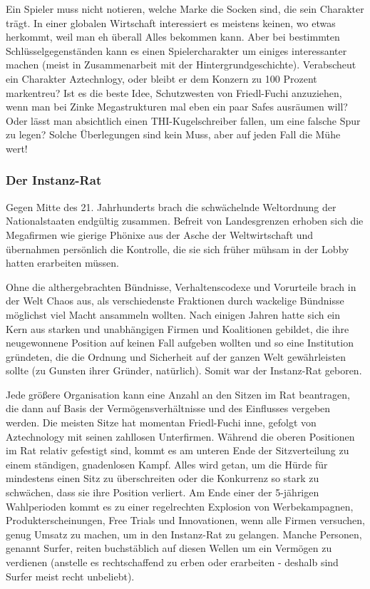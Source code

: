 Ein Spieler muss nicht notieren, welche Marke die Socken sind, die sein Charakter trägt. In einer globalen Wirtschaft interessiert es meistens keinen, wo etwas herkommt, weil man eh überall Alles bekommen kann. Aber bei bestimmten Schlüsselgegenständen kann es einen Spielercharakter um einiges interessanter machen (meist in Zusammenarbeit mit der Hintergrundgeschichte). Verabscheut ein Charakter Aztechnlogy, oder bleibt er dem Konzern zu 100 Prozent markentreu? Ist es die beste Idee, Schutzwesten von Friedl-Fuchi anzuziehen, wenn man bei Zinke Megastrukturen mal eben ein paar Safes ausräumen will? Oder lässt man absichtlich einen THI-Kugelschreiber fallen, um eine falsche Spur zu legen? Solche Überlegungen sind kein Muss, aber auf jeden Fall die Mühe wert!
\subsubsection{Der Instanz-Rat}
Gegen Mitte des 21. Jahrhunderts brach die schwächelnde Weltordnung der Nationalstaaten endgültig zusammen. Befreit von Landesgrenzen erhoben sich die Megafirmen wie gierige Phönixe aus der Asche der Weltwirtschaft und übernahmen persönlich die Kontrolle, die sie sich früher mühsam in der Lobby hatten erarbeiten müssen.

Ohne die althergebrachten Bündnisse, Verhaltenscodexe und Vorurteile brach in der Welt Chaos aus, als verschiedenste Fraktionen durch wackelige Bündnisse möglichst viel Macht ansammeln wollten. Nach einigen Jahren hatte sich ein Kern aus starken und unabhängigen Firmen und Koalitionen gebildet, die ihre neugewonnene Position auf keinen Fall aufgeben wollten und so eine Institution gründeten, die die Ordnung und Sicherheit auf der ganzen Welt gewährleisten sollte (zu Gunsten ihrer Gründer, natürlich). Somit war der Instanz-Rat geboren.

Jede größere Organisation kann eine Anzahl an den Sitzen im Rat beantragen, die dann auf Basis der Vermögensverhältnisse und des Einflusses vergeben werden. Die meisten Sitze hat momentan Friedl-Fuchi inne, gefolgt von Aztechnology mit seinen zahllosen Unterfirmen. Während die oberen Positionen im Rat relativ gefestigt sind, kommt es am unteren Ende der Sitzverteilung zu einem ständigen, gnadenlosen Kampf. Alles wird getan, um die Hürde für mindestens einen Sitz zu überschreiten oder die Konkurrenz so stark zu schwächen, dass sie ihre Position verliert. Am Ende einer der 5-jährigen Wahlperioden kommt es zu einer regelrechten Explosion von Werbekampagnen, Produkterscheinungen, Free Trials und Innovationen, wenn alle Firmen versuchen, genug Umsatz zu machen, um in den Instanz-Rat zu gelangen. Manche Personen, genannt \glqq Surfer\grqq{}, reiten buchstäblich auf diesen Wellen um ein Vermögen zu verdienen (anstelle es rechtschaffend zu erben oder erarbeiten - deshalb sind Surfer meist recht unbeliebt).

